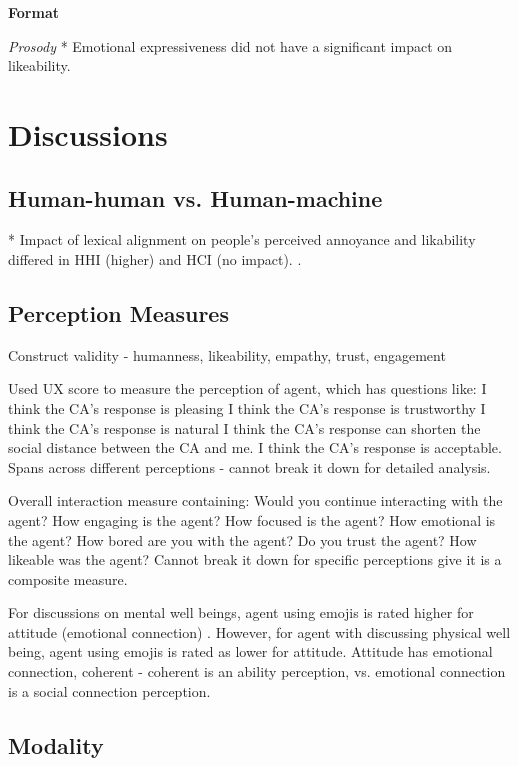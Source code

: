 \documentclass[sigconf,screen,review, anonymous]{acmart}
\newcommand{\cmt}[1]{}%
\begin{document}
%
\textbf{Format}

\textit{Prosody}
*  Emotional expressiveness did not have a significant impact on likeability. \cite{zhu2022effects}\cmt{[26]}

\section{Discussions}

\subsection{Human-human vs. Human-machine}

* Impact of lexical alignment on people's perceived annoyance and likability differed in HHI (higher) and HCI (no impact). \cite{huiyang2022improving}\cmt{[17]}.

\subsection{Perception Measures}

Construct validity - humanness, likeability, empathy, trust, engagement

Used UX score to measure the perception of agent, which has questions like:
I think the CA's response is pleasing
I think the CA's response is trustworthy
I think the CA's response is natural
I think the CA's response can shorten the social distance between the CA and me.
I think the CA's response is acceptable.
Spans across different perceptions - cannot break it down for detailed analysis. \cite{ma2022ask}\cmt{[29]}

Overall interaction measure containing: 
Would you continue interacting with the agent?
How engaging is the agent?
How focused is the agent?
How emotional is the agent?
How bored are you with the agent?
Do you trust the agent?
How likeable was the agent?
Cannot break it down for specific perceptions give it is a composite measure. \cite{hoegen2019end}\cmt{[31]}

For discussions on mental well beings, agent using emojis is rated higher for attitude (emotional connection) . However, for agent with discussing physical well being, agent using emojis is rated as lower for attitude. 
Attitude has emotional connection, coherent - coherent is an ability perception, vs. emotional connection is a social connection perception. \cite{fadhil2018effect}\cmt{[52]}

\subsection{Modality}
\end{document}
